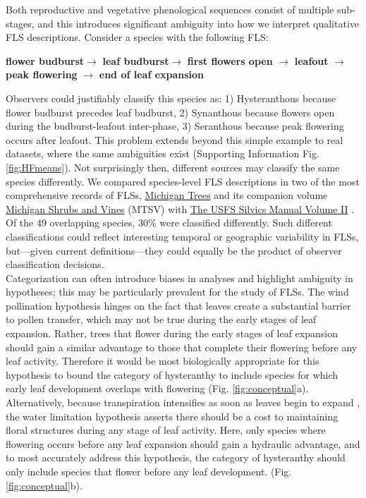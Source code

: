 \documentclass[11pt]{article}
\begin{document}
\noindent Both reproductive and vegetative phenological sequences consist of multiple sub-stages, and this introduces significant ambiguity into how we interpret qualitative FLS descriptions. Consider a species with the following FLS:\\

\begin{center}
\textbf{flower budburst}$\rightarrow$ \textbf{leaf budburst}$\rightarrow$ \textbf{first flowers open} $\rightarrow$ \textbf{leafout} $\rightarrow$ \textbf{peak flowering} $\rightarrow$ \textbf{end of leaf expansion} \\
\end{center}

\noindent Observers could justifiably classify this species as: 1) Hysteranthous because flower budburst precedes leaf budburst, 2) Synanthous because flowers open during the budburst-leafout inter-phase, 3) Seranthous because peak flowering occurs after leafout. This problem extends beyond this simple example to real datasets, \citep[e.g.][]{OKeefe2015} where the same ambiguities exist (Supporting Information Fig. \ref{fig:HFmeans}). Not surprisingly then, different sources may classify the same species differently. We compared species-level FLS descriptions in two of the most comprehensive records of FLSs, \underline{Michigan Trees} and its companion volume \underline{Michigan Shrubs and Vines} (MTSV) \citep{Barnes2004,Barnes2016} with \underline{The USFS Silvics Manual Volume II} \citep{Burns1990}. Of the 49 overlapping species, 30\% were classified differently. Such different classifications could reflect interesting temporal or geographic variability in FLSs, but---given current definitions---they could equally be the product of observer classification decisions.\\

\noindent Categorization can often introduce biases in analyses \citep{Edwards2015} and highlight ambiguity in hypotheses; this may be particularly prevalent for the study of FLSs. The wind pollination hypothesis hinges on the fact that leaves create a substantial barrier to pollen transfer, which may not be true during the early stages of leaf expansion. Rather, trees that flower during the early stages of leaf expansion should gain a similar advantage to those that complete their flowering before any leaf activity. Therefore it would be most biologically appropriate for this hypothesis to bound the category of hysteranthy to include species for which early leaf development overlaps with flowering (Fig. \ref{fig:conceptual}a). Alternatively, because transpiration intensifies as soon as leaves begin to expand \citep{%
Wang2018}, the water limitation hypothesis asserts there should be a cost to maintaining floral structures during any stage of leaf activity. Here, only species where flowering occurs before any leaf expansion should gain a hydraulic advantage, and to most accurately address this hypothesis, the category of hysteranthy should only include species that flower before any leaf development. (Fig. \ref{fig:conceptual}b).\\ 
\end{document}

